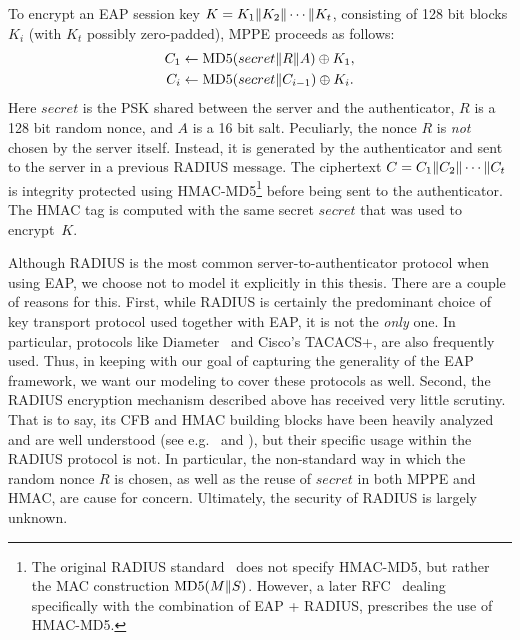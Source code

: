 To encrypt an EAP session key $K = K_1 \| K_2 \| \dotsb \| K_t$,
consisting of 128 bit blocks $K_i$ (with $K_t$ possibly zero-padded),
MPPE proceeds as follows:
\begin{align}\label{eq:EAP:MPPE}
	C_1 &\gets \operatorname{MD5}(secret \| R \| A) \oplus K_1 , \\
	C_i &\gets \operatorname{MD5}(secret \| C_{i-1}) \oplus K_i .
\end{align} 
Here $secret$ is the PSK shared between the server and the authenticator, 
$R$ is a 128 bit random nonce,
and $A$ is a 16 bit salt.
Peculiarly,
the nonce $R$ is \emph{not} chosen by the server itself.
Instead, it is generated by the authenticator and sent to the server in a previous RADIUS message.
The ciphertext $C = C_1 \| C_2 \| \dotsb \| C_t$ is integrity protected using HMAC-MD5\footnote{The original RADIUS standard~\cite{IETF:RFC2865:RADIUS} does not specify HMAC-MD5,
but rather the MAC construction $\operatorname{MD5}(M \| S)$. 
However, a later RFC~\cite{IETF:RFC3579:RADIUS+EAP} dealing specifically with the combination of EAP + RADIUS,
prescribes the use of HMAC-MD5.
} 
before being sent to the authenticator.
The HMAC tag is computed with the same secret $secret$ that was used to encrypt~$K$. 


Although RADIUS is the most common server-to-authenticator protocol when using EAP,
we choose not to model it explicitly in this thesis.
There are a couple of reasons for this.
First,
while RADIUS is certainly the predominant choice of key transport protocol used together with EAP,
it is not the \emph{only} one.
In particular,
protocols like Diameter~\cite{IETF:RFC6733:DIAMETER} and Cisco's TACACS+\cite{IETF:DRAFT:TACACS+},
are also frequently used.
Thus,
in keeping with our  goal of capturing the generality of the EAP framework,
we want our modeling to cover these protocols as well.
Second,
the RADIUS encryption mechanism described above has received very little scrutiny. 
That is to say,
its CFB and HMAC building blocks have been heavily analyzed and are well understood
(see e.g.~\cite{EPRINT:Wooding08} and \cite{JC:Bellare15}),
but their specific usage within the RADIUS protocol is not.
In particular,
the non-standard way in which the random nonce $R$ is chosen,
as well as the reuse of $secret$ in both MPPE and HMAC,
are cause for concern.
Ultimately,
the security of RADIUS is largely unknown.

